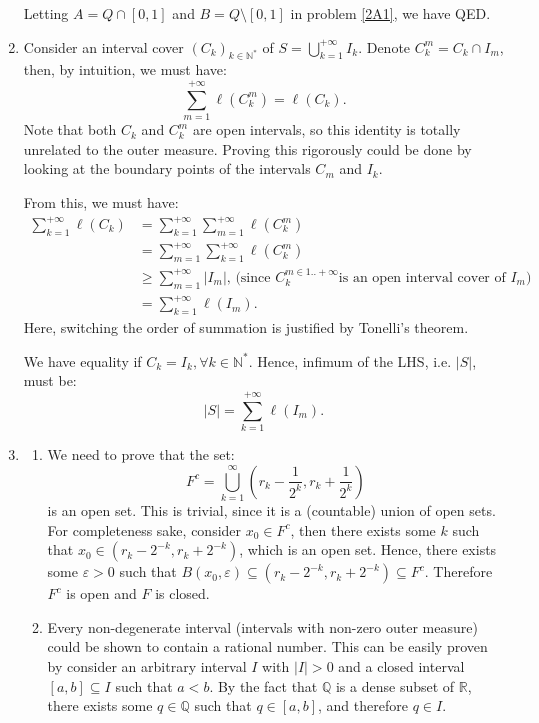 \begin{enumerate}[label=\textbf{2A.\arabic*}]
  Letting \( A = Q \cap [0, 1] \) and \( B = Q \setminus [0, 1] \) in problem
  \ref{2A1}, we have QED.
\item 
  Consider an interval cover \( (C_{k})_{k \in \mathbb{N}^{*}} \) of \( S =
  \bigcup_{k=1}^{+\infty} I_{k}  \). Denote \( C^{m}_{k} = C_{k} \cap I_{m} \),
  then, by intuition, we must have:
  \[
    \sum_{m = 1}^{+\infty} \ell(C^{m}_{k}) = \ell(C_{k})
  .\] 
  Note that both \( C_{k} \) and \( C^{m}_{k} \) are open intervals, so this
  identity is totally unrelated to the outer measure. Proving this rigorously
  could be done by looking at the boundary points of the intervals \( C_{m} \)
  and \( I_{k} \).

  From this, we must have:
  \begin{align*}
    \sum_{k = 1}^{+\infty} \ell(C_{k}) &= \sum_{k = 1}^{+\infty} \sum_{m =
    1}^{+\infty} \ell(C^{m}_{k}) \\
    &= \sum_{m = 1}^{+\infty} \sum_{k = 1}^{+\infty} \ell(C^{m}_{k}) \\
    &\ge \sum_{m = 1}^{+\infty} |I_{m}| \text{, (since } C^{m \in 1..+\infty}_{k}
    \text{is an open interval cover of } I_{m} \text{)} \\
    &= \sum_{k = 1}^{+\infty} \ell(I_{m})
  .\end{align*}
  Here, switching the order of summation is justified by Tonelli's theorem.

  We have equality if \( C_{k} = I_{k}, \forall k \in \mathbb{N}^{*} \). Hence,
  infimum of the LHS, i.e. \( |S| \), must be:
  \[
    |S| = \sum_{k = 1}^{+\infty} \ell(I_{m})
  .\] 
\item \label{2A12}
    \begin{enumerate}[label=(\alph*)]
      \item We need to prove that the set:
        \[
          F^{c} = \bigcup_{k = 1}^{\infty} \left( r_{k} - \frac{1}{2^{k}}, r_{k}
          + \frac{1}{2^{k}}\right) 
        \] is an open set. This is trivial, since it is a (countable) union of
        open sets. For completeness sake, consider \( x_{0} \in F^{c} \), then
        there exists some \( k \) such that \( x_{0} \in \left( r_{k}-2^{-k},
        r_{k}+2^{-k} \right)  \), which is an open set. Hence, there exists some
        \( \varepsilon > 0 \) such that \( B(x_{0},\varepsilon) \subseteq
        (r_{k}-2^{-k}, r_{k}+2^{-k}) \subseteq F^{c} \). Therefore \( F^{c} \)
        is open and \( F \) is closed.
    \item Every non-degenerate interval (intervals with non-zero outer measure)
      could be shown to contain a rational number. This can be easily proven by
      consider an arbitrary interval \( I \) with \( |I| > 0 \) and a closed
      interval \( [a, b] \subseteq I \) such that \( a < b \).
      By the fact that \( \mathbb{Q} \) is a
      dense subset of \( \mathbb{R} \), there exists some \( q \in \mathbb{Q} \)
      such that \( q \in [a, b] \), and therefore \( q \in I \).


\end{enumerate}
\end{enumerate}
